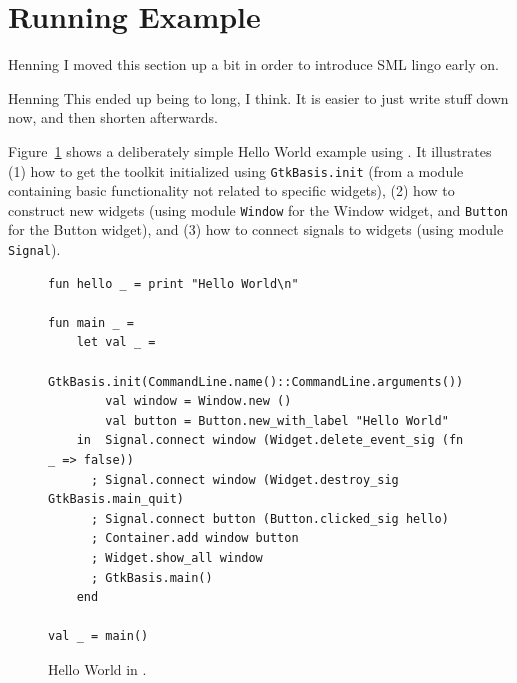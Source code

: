 \documentclass[workingdraft,endnotes]{usetex-v1}
\begin{document}
\section{Running Example}
\label{sec:example}

\begin{ednote}{Henning}
  I moved this section up a bit in order to introduce SML lingo
  early on.
\end{ednote}

\begin{ednote}{Henning}
  This ended up being to long, I think.
  It is easier to just write stuff down now, and then shorten
  afterwards.
\end{ednote}

Figure~\ref{fig:hello-world} shows a deliberately simple Hello World
example using \mgtk. It illustrates (1) how to get the toolkit
initialized using \texttt{GtkBasis.init} (from a module containing
basic \gtk functionality not related to specific widgets), (2) how to
construct new widgets (using module \texttt{Window} for the Window
widget, and \texttt{Button} for the Button widget), and (3) how to
connect signals to widgets (using module \texttt{Signal}).
\begin{figure}[htbp]
\begin{centering}
\begin{verbatim}
fun hello _ = print "Hello World\n"

fun main _ =
    let val _ = 
           GtkBasis.init(CommandLine.name()::CommandLine.arguments())
        val window = Window.new ()
        val button = Button.new_with_label "Hello World"
    in  Signal.connect window (Widget.delete_event_sig (fn _ => false))
      ; Signal.connect window (Widget.destroy_sig GtkBasis.main_quit)
      ; Signal.connect button (Button.clicked_sig hello)
      ; Container.add window button
      ; Widget.show_all window
      ; GtkBasis.main() 
    end

val _ = main()
\end{verbatim}
\caption{Hello World in \mgtk.\label{fig:hello-world}}
\end{centering}
\end{figure}
\end{document}
